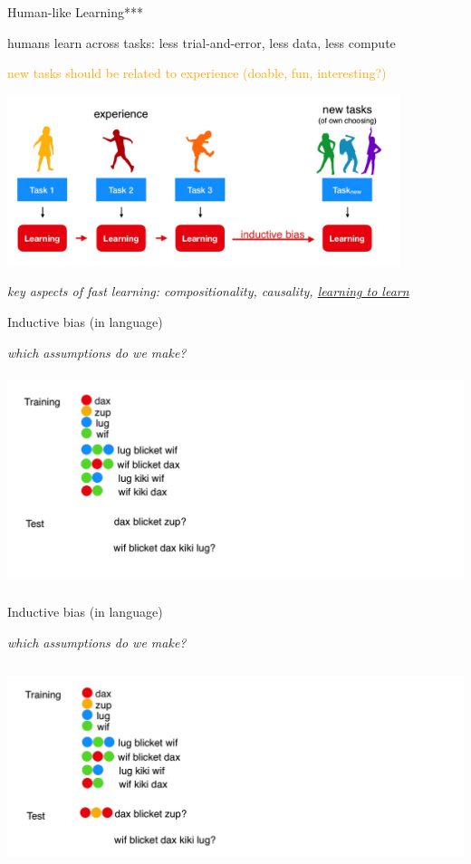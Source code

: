 \documentclass[aspectratio=169,t,handout,xcolor={usenames,dvipsnames}]{beamer}
\begin{document}
\begin{frame}{Human-like Learning***}
\centerline{humans learn across tasks: less trial-and-error, less data, less compute}
\centerline{\textcolor{orange}{new tasks should be related to experience (doable, fun, interesting?)}}
 
\centering\includegraphics[height=5cm]{image/Jietu20220328-184546.jpg}

\centerline{\textit{key aspects of fast learning: compositionality, causality, \underline{learning to learn}}}
\end{frame}

\begin{frame}{Inductive bias (in language)}
\centerline{\textit{which assumptions do we make?}}
\centering\includegraphics[height=6.2cm]{image/Jietu20220328-185829.jpg}

\end{frame}

\begin{frame}{Inductive bias (in language)}
\centerline{\textit{which assumptions do we make?}}
\centering\includegraphics[height=6cm]{image/Jietu20220328-185953.jpg}

\end{frame}
\end{document}
